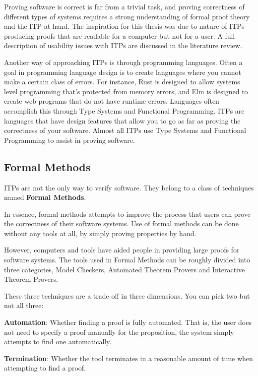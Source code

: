 \documentclass[
]{article}
\begin{document}
Proving software is correct is far from a trivial task, and proving
correctness of different types of systems requires a strong
understanding of formal proof theory and the ITP at hand. The
inspiration for this thesis was due to nature of ITPs producing proofs
that are readable for a computer but not for a user. A full description
of usability issues with ITPs are discussed in the literature review.

Another way of approaching ITPs is through programming languages. Often
a goal in programming language design is to create languages where you
cannot make a certain class of errors. For instance, Rust is designed to
allow systems level programming that's protected from memory errors, and
Elm is designed to create web programs that do not have runtime errors.
Languages often accomplish this through Type Systems and Functional
Programming. ITPs are languages that have design features that allow you
to go as far as proving the correctness of your software. Almost all
ITPs use Type Systems and Functional Programming to assist in proving
software.

\hypertarget{formal-methods}{%
\subsection{Formal Methods}\label{formal-methods}}

ITPs are not the only way to verify software. They belong to a class of
techniques named \textbf{Formal Methods}.

In essence, formal methods attempts to improve the process that users
can prove the correctness of their software systems. Use of formal
methods can be done without any tools at all, by simply proving
properties by hand.

However, computers and tools have aided people in providing large proofs
for software systems. The tools used in Formal Methods can be roughly
divided into three categories, Model Checkers, Automated Theorem Provers
and Interactive Theorem Provers.

These three techniques are a trade off in three dimensions. You can pick
two but not all three:

\textbf{Automation}: Whether finding a proof is fully automated. That
is, the user does not need to specify a proof manually for the
proposition, the system simply attempts to find one automatically.

\textbf{Termination}: Whether the tool terminates in a reasonable amount
of time when attempting to find a proof.
\end{document}
